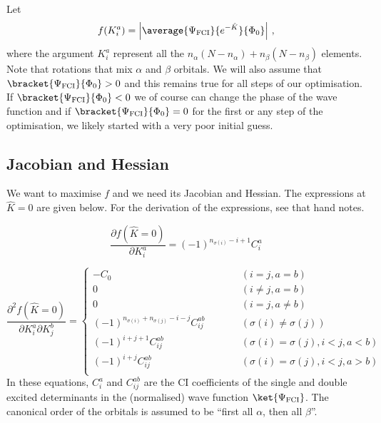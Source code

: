 \documentclass[a4paper,11pt]{article}
\begin{document}
Let
\begin{equation}
  f(K_i^a) = \left|\average{\Psi_\text{FCI}}{e^{-\hat{K}}}{\Phi_0}\right|\,,
\end{equation}
where the argument $K_i^a$ represent all the $n_\alpha(N-n_\alpha) + n_\beta(N-n_\beta)$ elements.
Note that rotations that mix $\alpha$ and $\beta$ orbitals.
We will also assume that $\bracket{\Psi_\text{FCI}}{\Phi_0} > 0$ and this remains true for all steps
of our optimisation.
If $\bracket{\Psi_\text{FCI}}{\Phi_0} < 0$ we of course can change the phase of the wave function and
if $\bracket{\Psi_\text{FCI}}{\Phi_0} = 0$ for the first or any step of the optimisation, we likely started with a very poor initial guess.

\subsection{Jacobian and Hessian}

We want to maximise $f$ and we need its Jacobian and Hessian.
The expressions at $\hat{K} = 0$ are given below.
For the derivation of the expressions, see that hand notes.

\begin{equation}
  \frac{\partial f(\hat{K} = 0)}{\partial K_i^a} = (-1)^{n_{\sigma(i)} - i + 1} C_i^a
\end{equation}

\begin{equation}
  \frac{\partial^2 f(\hat{K} = 0)}{\partial K_i^a \partial K_j^b} =
  \left\{
    \begin{array}{lcr}
      -C_0 & \quad\quad & (i = j, a = b)\\
      0 & \quad\quad & (i \ne j, a = b)\\
      0 & \quad\quad & (i = j, a \ne b)\\
      (-1)^{n_{\sigma(i)}+n_{\sigma(j)}-i-j}C_{ij}^{ab} & \quad\quad & (\sigma(i) \ne \sigma(j))\\
      (-1)^{i+j+1}C_{ij}^{ab} & \quad\quad & (\sigma(i) = \sigma(j), i<j, a<b)\\
      (-1)^{i+j}C_{ij}^{ab} & \quad\quad & (\sigma(i) = \sigma(j), i<j, a>b)\\
    \end{array}
  \right.
\end{equation}
In these equations, $C_i^a$ and $C_{ij}^{ab}$ are the CI coefficients of the single and double excited determinants in the (normalised) wave function $\ket{\Psi_\text{FCI}}$.
The canonical order of the orbitals is assumed to be ``first all $\alpha$, then all $\beta$''.
\end{document}
